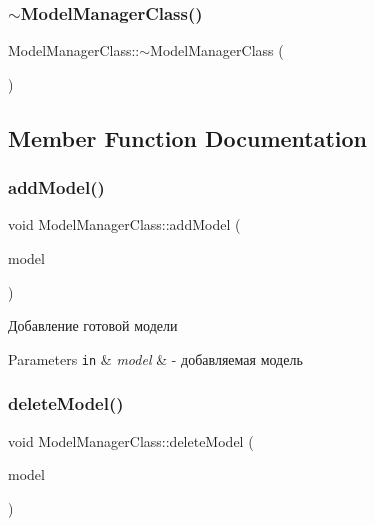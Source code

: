\subsubsection{\texorpdfstring{$\sim$\+Model\+Manager\+Class()}{~ModelManagerClass()}}
{\footnotesize\ttfamily Model\+Manager\+Class\+::$\sim$\+Model\+Manager\+Class (\begin{DoxyParamCaption}{ }\end{DoxyParamCaption})\hspace{0.3cm}{\ttfamily [private]}}



\subsection{Member Function Documentation}
\mbox{\label{class_model_manager_class_a16eb12589fefbed876d9b71a3acfeef6}} 
\subsubsection{\texorpdfstring{add\+Model()}{addModel()}}
{\footnotesize\ttfamily void Model\+Manager\+Class\+::add\+Model (\begin{DoxyParamCaption}\item[{\hyperlink{class_model_class}{Model\+Class} $\ast$}]{model }\end{DoxyParamCaption})}



Добавление готовой модели 


\begin{DoxyParams}[1]{Parameters}
\mbox{\tt in}  & {\em model} & -\/ добавляемая модель \\
\hline
\end{DoxyParams}
\mbox{\label{class_model_manager_class_a00347e56781ac242aba4f72f0c27dd5f}} 
\subsubsection{\texorpdfstring{delete\+Model()}{deleteModel()}}
{\footnotesize\ttfamily void Model\+Manager\+Class\+::delete\+Model (\begin{DoxyParamCaption}\item[{\hyperlink{class_model_class}{Model\+Class} $\ast$}]{model }\end{DoxyParamCaption})}



